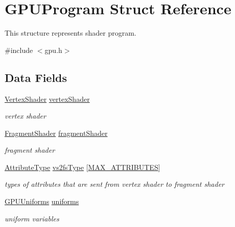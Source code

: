 \hypertarget{structGPUProgram}{}\section{G\+P\+U\+Program Struct Reference}
\label{structGPUProgram}


This structure represents shader program.  




{\ttfamily \#include $<$gpu.\+h$>$}

\subsection*{Data Fields}
\begin{DoxyCompactItemize}
\item 
\mbox{\label{structGPUProgram_a8edd806f533bb1124101781621648925}} 
\hyperlink{gpu_8h_add19b2ac87272745c0da3ef10d2f4160}{Vertex\+Shader} \hyperlink{structGPUProgram_a8edd806f533bb1124101781621648925}{vertex\+Shader}
\begin{DoxyCompactList}\small\item\em vertex shader \end{DoxyCompactList}\item 
\mbox{\label{structGPUProgram_acb129bfc2dea5836bd1ed8e899cda649}} 
\hyperlink{gpu_8h_aa8727db7547712b2d7dbb9de657c6175}{Fragment\+Shader} \hyperlink{structGPUProgram_acb129bfc2dea5836bd1ed8e899cda649}{fragment\+Shader}
\begin{DoxyCompactList}\small\item\em fragment shader \end{DoxyCompactList}\item 
\mbox{\label{structGPUProgram_a19d88694b9011a8c567854467c0dc123}} 
\hyperlink{gpu_8h_a349a9cde14be8097df865ba0469c0ab2}{Attribute\+Type} \hyperlink{structGPUProgram_a19d88694b9011a8c567854467c0dc123}{vs2fs\+Type} \mbox{[}\hyperlink{student_2fwd_8h_a4d992a1f9192388588184753115f6c03}{M\+A\+X\+\_\+\+A\+T\+T\+R\+I\+B\+U\+T\+ES}\mbox{]}
\begin{DoxyCompactList}\small\item\em types of attributes that are sent from vertex shader to fragment shader \end{DoxyCompactList}\item 
\mbox{\label{structGPUProgram_a707edbfaa82eb74936bfbb990c845706}} 
\hyperlink{structGPUUniforms}{G\+P\+U\+Uniforms} \hyperlink{structGPUProgram_a707edbfaa82eb74936bfbb990c845706}{uniforms}
\begin{DoxyCompactList}\small\item\em uniform variables \end{DoxyCompactList}\end{DoxyCompactItemize}


